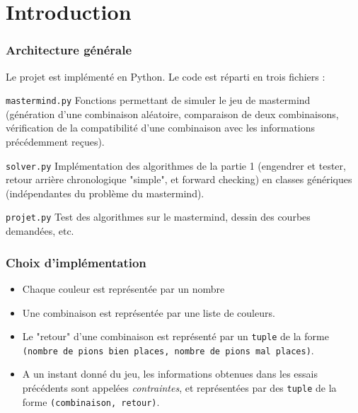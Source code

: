 \documentclass[a4paper, 12pt]{report}
\newcommand{\py}[1]{\texttt{#1}}
\newenvironment{aligneddescription}
	{\begin{tcolorbox}
		\begin{description}[leftmargin=!, labelwidth=\widthof{\bfseries The longest label}]	
	}
	{\end{description}\end{tcolorbox}}
\begin{document}
\part*{Introduction}

\section*{Architecture générale}
Le projet est implémenté en Python. Le code est réparti en trois fichiers :

\begin{aligneddescription}
	\item[\py{mastermind.py}] Fonctions permettant de simuler le jeu de mastermind (génération d'une combinaison aléatoire, comparaison de deux combinaisons, vérification de la compatibilité d'une combinaison avec les informations précédemment reçues).
	
	\item[\py{solver.py}] Implémentation des algorithmes de la partie 1 (engendrer et tester, retour arrière chronologique "simple", et forward checking) en classes génériques (indépendantes du problème du mastermind).
	
	\item[\py{projet.py}] Test des algorithmes sur le mastermind, dessin des courbes demandées, etc.
\end{aligneddescription}

\section*{Choix d'implémentation}

\begin{itemize}
	\item Chaque couleur est représentée par un nombre
	
	\item Une combinaison est représentée par une liste de couleurs.
	
	\item Le "retour" d'une combinaison est représenté par un \py{tuple} de la forme \\
	      \py{(nombre de pions bien places, nombre de pions mal places)}.
	
	\item A un instant donné du jeu, les informations obtenues dans les essais précédents sont appelées \textit{contraintes}, et représentées par des \py{tuple} de la forme \py{(combinaison, retour)}.
\end{itemize}
\end{document}
